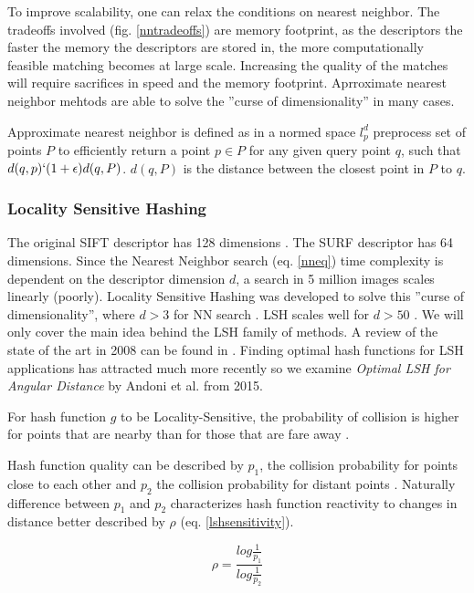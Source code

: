 \documentclass[english,12pt,a4paper,pdftex,elec,utf8]{aaltothesis}
\begin{document}
To improve scalability, one can relax the conditions on nearest neighbor. The tradeoffs involved (fig. \ref{nntradeoffs}) are memory footprint, as the descriptors the faster the memory the descriptors are stored in, the more computationally feasible matching becomes at large scale. Increasing the quality of the matches will require sacrifices in speed and the memory footprint. Aprroximate nearest neighbor mehtods are able to solve the ''curse of dimensionality'' in many cases.

Approximate nearest neighbor is defined as in a normed space $l_p^d$ preprocess set of points $P$ to efficiently return a point $p\in P$ for any given query point $q$, such that $d(q,p) \lq (1 + \epsilon)d(q,P)$. $d(q, P)$ is the distance between the closest point in $P$ to $q$. \cite{Gionis1999}

\subsubsection{Locality Sensitive Hashing}
The original SIFT descriptor has 128 dimensions \cite{Lowe1999}.  The SURF descriptor has 64 dimensions. Since the Nearest Neighbor search (eq. \ref{nneq}) time complexity is dependent on the descriptor dimension $d$, a search in 5 million images scales linearly (poorly). Locality Sensitive Hashing was developed to solve this ''curse of dimensionality'', where $d > 3$ for NN search \cite{Gionis1999}. LSH scales well for $d > 50$ \cite{Gionis1999}. We will only cover the main idea behind the LSH family of methods. A review of the state of the art in 2008 can be found in \cite{Andoni2008}. Finding optimal hash functions for LSH applications has attracted much more recently so we examine \emph{Optimal LSH for Angular Distance} \cite{Andoni2015} by Andoni et al. from 2015.

For hash function $g$ to be Locality-Sensitive, the probability of collision is higher for points that are nearby than for those that are fare away \cite{Andoni2015}.

Hash function quality can be described by $p_1$, the collision probability for points close to each other and $p_2$ the collision probability for distant points \cite{Andoni2015}. Naturally difference between $p_1$ and $p_2$ characterizes hash function reactivity to changes in distance better described by $\rho$ (eq. \ref{lshsensitivity}).

\begin{equation}
  \label{lshsensitivity}
  \rho = \frac{log\frac{1}{p_1}}{log\frac{1}{p_2}}
  \end{equation}
\end{document}

